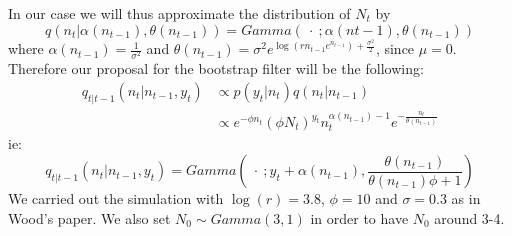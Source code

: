 \documentclass{article}
\begin{document}
In our case we will thus approximate the distribution of $N_t$ by
\begin{equation*}
q(n_t|\alpha(n_{t-1}), \theta(n_{t-1})) = Gamma(\ \cdot \ ; \alpha(n{t-1}), \theta(n_{t-1}) )
\end{equation*}
where $ \alpha(n_{t-1})= \frac{1}{\sigma^2}$ and $\theta(n_{t-1})=\sigma^2e^{\log(rn_{t-1}e^{n_{t-1}})+\frac{\sigma^2}{2}}$, since $\mu = 0$.\\
Therefore our proposal for the bootstrap filter will be the following:
\begin{equation*}
\begin{split}
q_{t|t-1}(n_t|n_{t-1}, y_t) & \propto  p(y_t|n_t)q(n_t|n_{t-1}) \\
& \propto e^{-\phi n_t}(\phi N_t)^{y_t}n_t^{\alpha(n_{t-1})-1}e^{-\frac{n_t}{\theta(n_{t-1})}}
\end{split}
\end{equation*}
ie:
\begin{equation*}
q_{t|t-1}(n_t|n_{t-1}, y_t) = Gamma(\ \cdot \ ; y_t+\alpha(n_{t-1}), \frac{\theta(n_{t-1})}{\theta(n_{t-1})\phi + 1})\end{equation*}
We carried out the simulation with $\log(r)=3.8$, $\phi=10$ and $\sigma=0.3$ as in Wood's paper. We also set $N_0 \sim Gamma(3,1)$ in order to have $N_0$ around 3-4.
\end{document}
